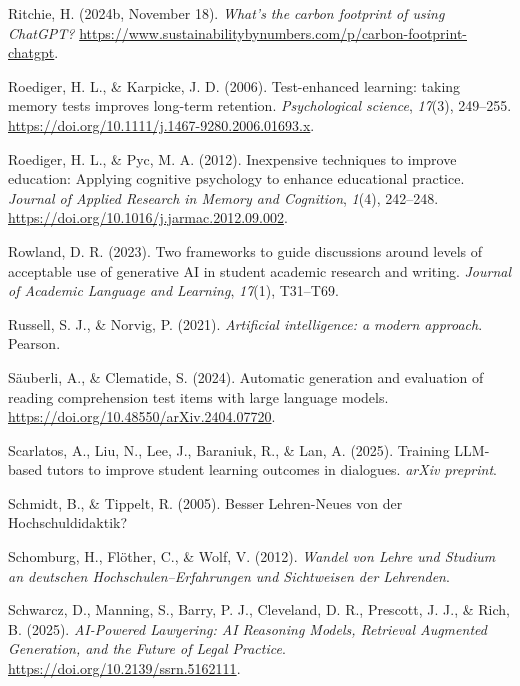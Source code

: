 \documentclass[
  ngerman,
  letterpaper,
  DIV=11]{scrreprt}
\newlength{\cslhangindent}
\newenvironment{CSLReferences}[2] %
 {\begin{list}{}{%
  \setlength{\itemindent}{0pt}
  \setlength{\leftmargin}{0pt}
  \setlength{\parsep}{0pt}
  \ifodd #1
   \setlength{\leftmargin}{\cslhangindent}
   \setlength{\itemindent}{-1\cslhangindent}
  \fi
  \setlength{\itemsep}{#2\baselineskip}}}
 {\end{list}}
\begin{document}
\begin{CSLReferences}{1}{0}
Ritchie, H. (2024b, November 18). \emph{What's the carbon footprint of
using ChatGPT?}
\url{https://www.sustainabilitybynumbers.com/p/carbon-footprint-chatgpt}.

Roediger, H. L., \& Karpicke, J. D. (2006). Test-enhanced learning:
taking memory tests improves long-term retention. \emph{Psychological
science}, \emph{17}(3), 249--255.
\url{https://doi.org/10.1111/j.1467-9280.2006.01693.x}.

Roediger, H. L., \& Pyc, M. A. (2012). Inexpensive techniques to improve
education: Applying cognitive psychology to enhance educational
practice. \emph{Journal of Applied Research in Memory and Cognition},
\emph{1}(4), 242--248.
\url{https://doi.org/10.1016/j.jarmac.2012.09.002}.

Rowland, D. R. (2023). Two frameworks to guide discussions around levels
of acceptable use of generative AI in student academic research and
writing. \emph{Journal of Academic Language and Learning}, \emph{17}(1),
T31--T69.

Russell, S. J., \& Norvig, P. (2021). \emph{Artificial intelligence: a
modern approach}. Pearson.

Säuberli, A., \& Clematide, S. (2024). Automatic generation and
evaluation of reading comprehension test items with large language
models. \url{https://doi.org/10.48550/arXiv.2404.07720}.

Scarlatos, A., Liu, N., Lee, J., Baraniuk, R., \& Lan, A. (2025).
Training LLM-based tutors to improve student learning outcomes in
dialogues. \emph{arXiv preprint}.

Schmidt, B., \& Tippelt, R. (2005). Besser Lehren-Neues von der
Hochschuldidaktik?

Schomburg, H., Flöther, C., \& Wolf, V. (2012). \emph{Wandel von Lehre
und Studium an deutschen Hochschulen--Erfahrungen und Sichtweisen der
Lehrenden}.

Schwarcz, D., Manning, S., Barry, P. J., Cleveland, D. R., Prescott, J.
J., \& Rich, B. (2025). \emph{AI-Powered Lawyering: AI Reasoning Models,
Retrieval Augmented Generation, and the Future of Legal Practice}.
\url{https://doi.org/10.2139/ssrn.5162111}.


\end{CSLReferences}
\end{document}
